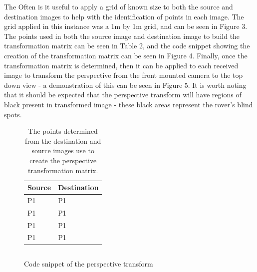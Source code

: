 \documentclass[a4paper]{article}
\begin{document}
The Often is it useful to apply a grid of known size to both the source and destination images to help with the identification of points in each image. The grid applied in this instance was a 1$\si{\meter}$ by 1$\si{\meter}$ grid, and can be seen in Figure 3. The points used in both the source image and destination image to build the transformation matrix can be seen in Table 2, and the code snippet showing the creation of the transformation matrix can be seen in Figure 4. Finally, once the transformation matrix is determined, then it can be applied to each received image to transform the perspective from the front mounted camera to the top down view - a demonstration of this can be seen in Figure 5. It is worth noting that it should be expected that the perspective transform will have regions of black present in transformed image - these black areas represent the rover's blind spots.

\begin{figure}
	\begin{minipage}{0.45\linewidth}
		\begin{table}
		\caption{The points determined from the destination and source images use to create the perspective transformation matrix.}
		\begin{tabular}{ll}
		\toprule
		\textbf{Source} & \textbf{Destination}\\
		\midrule
		P1 & P1\\
		P1 & P1\\
		P1 & P1\\
		P1 & P1\\
		\bottomrule
		\end{tabular}
		\end{table}
	\end{minipage}
	\begin{minipage}{0.45\linewidth}
		\begin{lstlisting}[language=Python]

		\end{lstlisting}
		\caption{Code snippet of the perspective transform}
	\end{minipage}
\end{figure}
\end{document}
